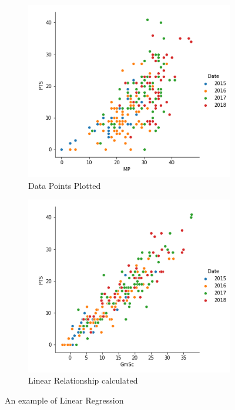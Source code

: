 \documentclass[a4paper,11pt,twoside]{article}
\begin{document}
\begin{figure} [h!]
  \centering
  \begin{subfigure}[b]{0.4\textwidth}
    \includegraphics[width=\textwidth]{pairplot1.png}
    \caption{Data Points Plotted}
    \label{fig:1}
  \end{subfigure}
  \begin{subfigure}[b]{0.4\textwidth}
    \includegraphics[width=\textwidth]{pairplot2.png}
    \caption{Linear Relationship calculated}
    \label{fig:2}
  \end{subfigure}
  \caption{An example of Linear Regression}
  \label{fig:3}
\end{figure}
\end{document}

